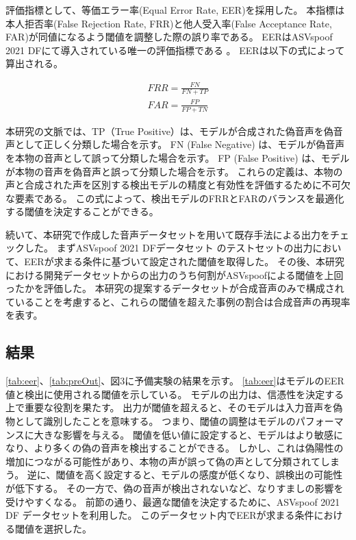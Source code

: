 評価指標として、等価エラー率(Equal Error Rate, EER)を採用した。
本指標は本人拒否率(False Rejection Rate, FRR)と他人受入率(False Acceptance Rate, FAR)が同値になるよう閾値を調整した際の誤り率である。
EERはASVspoof 2021 DFにて導入されている唯一の評価指標である \cite{10155166}。
EERは以下の式によって算出される。

\begin{align}
    FRR = \frac{FN}{FN+TP}\\
    FAR = \frac{FP}{FP+TN}
\end{align}

本研究の文脈では、TP（True Positive）は、モデルが合成された偽音声を偽音声として正しく分類した場合を示す。
FN (False Negative) は、モデルが偽音声を本物の音声として誤って分類した場合を示す。
FP (False Positive) は、モデルが本物の音声を偽音声と誤って分類した場合を示す。
これらの定義は、本物の声と合成された声を区別する検出モデルの精度と有効性を評価するために不可欠な要素である。
この式によって、検出モデルのFRRとFARのバランスを最適化する閾値を決定することができる。

続いて、本研究で作成した音声データセットを用いて既存手法による出力をチェックした。
まずASVspoof 2021 DFデータセット \cite{10155166}のテストセットの出力において、EERが求まる条件に基づいて設定された閾値を取得した。
その後、本研究における開発データセットからの出力のうち何割がASVspoofによる閾値を上回ったかを評価した。
本研究の提案するデータセットが合成音声のみで構成されていることを考慮すると、これらの閾値を超えた事例の割合は合成音声の再現率を表す。

\subsection{結果}
\cref{tab:eer}、\cref{tab:preOut}、図3に予備実験の結果を示す。
\cref{tab:eer}はモデルのEER値と検出に使用される閾値を示している。
モデルの出力は、信憑性を決定する上で重要な役割を果たす。
出力が閾値を超えると、そのモデルは入力音声を偽物として識別したことを意味する。
つまり、閾値の調整はモデルのパフォーマンスに大きな影響を与える。
閾値を低い値に設定すると、モデルはより敏感になり、より多くの偽の音声を検出することができる。
しかし、これは偽陽性の増加につながる可能性があり、本物の声が誤って偽の声として分類されてしまう。
逆に、閾値を高く設定すると、モデルの感度が低くなり、誤検出の可能性が低下する。
その一方で、偽の音声が検出されないなど、なりすましの影響を受けやすくなる。
前節の通り、最適な閾値を決定するために、ASVspoof 2021 DF データセットを利用した。
このデータセット内でEERが求まる条件における閾値を選択した。

